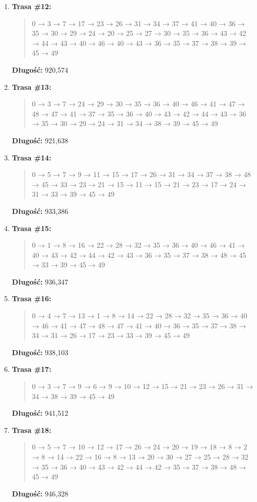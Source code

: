 \documentclass{article}
\begin{document}
\begin{enumerate}
    \item \textbf{Trasa \#12:}
    \begin{quote}
        0 → 3 → 7 → 17 → 23 → 26 → 31 → 34 → 37 → 41 → 40 → 36 → 35 → 30 → 29 → 24 → 20 → 25 → 27 → 30 → 35 → 36 → 43 → 42 → 44 → 43 → 40 → 46 → 40 → 43 → 36 → 35 → 37 → 38 → 39 → 45 → 49
    \end{quote}
    \textbf{Długość:} 920{,}574

    \item \textbf{Trasa \#13:}
    \begin{quote}
        0 → 3 → 7 → 24 → 29 → 30 → 35 → 36 → 40 → 46 → 41 → 47 → 48 → 47 → 41 → 37 → 35 → 36 → 40 → 43 → 42 → 44 → 43 → 36 → 35 → 30 → 29 → 24 → 31 → 34 → 38 → 39 → 45 → 49
    \end{quote}
    \textbf{Długość:} 921{,}638

    \item \textbf{Trasa \#14:}
    \begin{quote}
        0 → 5 → 7 → 9 → 11 → 15 → 17 → 26 → 31 → 34 → 37 → 38 → 48 → 45 → 33 → 23 → 21 → 15 → 11 → 15 → 21 → 23 → 17 → 24 → 31 → 33 → 39 → 45 → 49
    \end{quote}
    \textbf{Długość:} 933{,}386

    \item \textbf{Trasa \#15:}
    \begin{quote}
        0 → 1 → 8 → 16 → 22 → 28 → 32 → 35 → 36 → 40 → 46 → 41 → 40 → 43 → 42 → 44 → 42 → 43 → 36 → 35 → 37 → 38 → 48 → 45 → 33 → 39 → 45 → 49
    \end{quote}
    \textbf{Długość:} 936{,}347

    \item \textbf{Trasa \#16:}
    \begin{quote}
        0 → 4 → 7 → 13 → 1 → 8 → 14 → 22 → 28 → 32 → 35 → 36 → 40 → 46 → 41 → 47 → 48 → 47 → 41 → 40 → 36 → 35 → 37 → 38 → 34 → 31 → 26 → 17 → 23 → 33 → 39 → 45 → 49
    \end{quote}
    \textbf{Długość:} 938{,}103

    \item \textbf{Trasa \#17:}
    \begin{quote}
        0 → 3 → 7 → 9 → 6 → 9 → 10 → 12 → 15 → 21 → 23 → 26 → 31 → 34 → 38 → 39 → 45 → 49
    \end{quote}
    \textbf{Długość:} 941{,}512

    \item \textbf{Trasa \#18:}
    \begin{quote}
        0 → 5 → 7 → 10 → 12 → 17 → 26 → 24 → 20 → 19 → 18 → 8 → 2 → 8 → 14 → 22 → 16 → 8 → 13 → 20 → 30 → 27 → 25 → 28 → 32 → 35 → 36 → 40 → 43 → 42 → 44 → 42 → 35 → 37 → 38 → 48 → 45 → 49
    \end{quote}
    \textbf{Długość:} 946{,}328


\end{enumerate}
\end{document}
